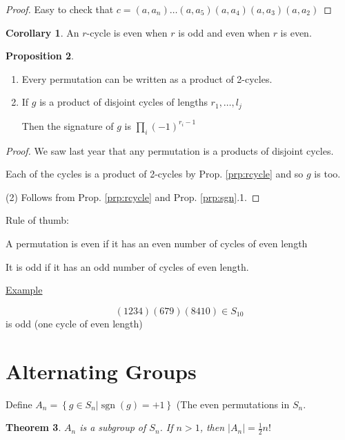 \documentclass{article}
\newtheorem{theorem}{Theorem}[section]
\theoremstyle{definition}
\newtheorem{proposition}[theorem]{Proposition}
\newtheorem{corollary}[theorem]{Corollary}
\DeclareMathOperator{\sgn}{sgn}
\begin{document}
\begin{proof}
  Easy to check that
    $c=(a,a_n)\ldots(a,a_5)(a,a_4)(a,a_3)(a,a_2)$
\end{proof}

\begin{corollary}
  An $r$-cycle is even when $r$ is odd and even when $r$ is even.
\end{corollary}

\begin{proposition}
  \begin{enumerate}
    \item Every permutation can be written as a product of 2-cycles.
    \item If $g$ is a product of disjoint cycles of lengths $r_1, \ldots, l_j$

      Then the signature of $g$ is $\prod_{i} (-1)^{r_i - 1}$
  \end{enumerate}
\end{proposition}

\begin{proof}
  We saw last year that any permutation is a products of disjoint cycles.

  Each of the cycles is a product of 2-cycles by Prop. \ref{prp:rcycle} and so $g$ is too.

  (2) Follows from Prop. \ref{prp:rcycle} and Prop. \ref{prp:sgn}.1.
\end{proof}

Rule of thumb:

A permutation is even if it has an even number of cycles of even length

It is odd if it has an odd number of cycles of even length.

\underline{Example}

$$(1 2 3 4)(6 7 9)(8 4 10) \in S_{10}$$ is odd (one cycle of even length)

\section{Alternating Groups}

Define $A_n=\left\{ g \in S_n | \sgn(g) = +1 \right\}$ (The even permutations
 in $S_n$.

\begin{theorem}
  $A_n$ is a subgroup of $S_n$. If $n>1$, then $|A_n|=\frac{1}{2}n!$
  \label{thm:subgroup}
\end{theorem}
\end{document}
